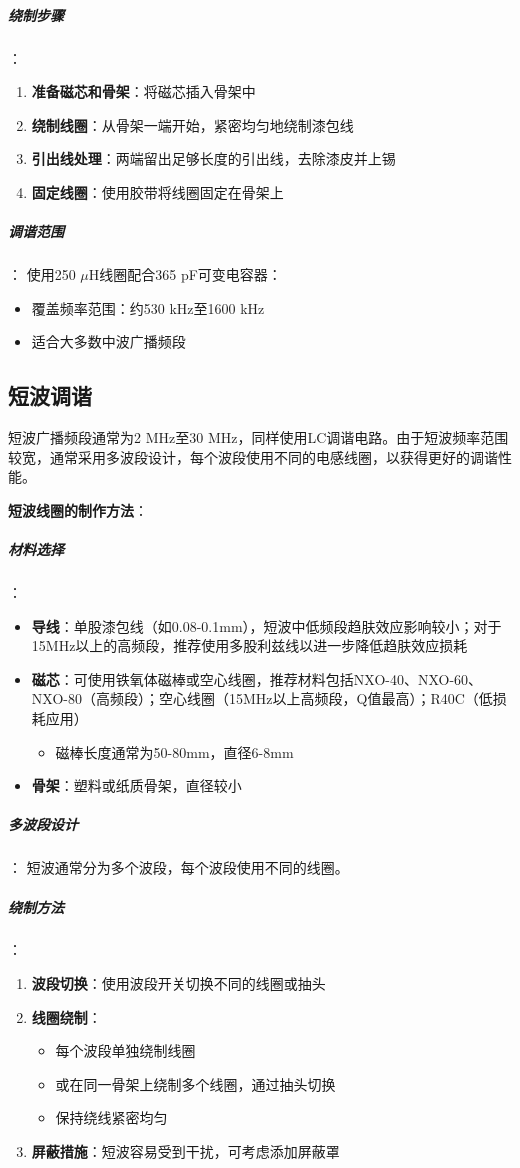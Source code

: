 \subparagraph{绕制步骤}：
\begin{enumerate}
    \item \textbf{准备磁芯和骨架}：将磁芯插入骨架中
    \item \textbf{绕制线圈}：从骨架一端开始，紧密均匀地绕制漆包线
    \item \textbf{引出线处理}：两端留出足够长度的引出线，去除漆皮并上锡
    \item \textbf{固定线圈}：使用胶带将线圈固定在骨架上
\end{enumerate}

\subparagraph{调谐范围}：
使用250 $\mu$H线圈配合365 pF可变电容器：
\begin{itemize}
    \item 覆盖频率范围：约530 kHz至1600 kHz
    \item 适合大多数中波广播频段
\end{itemize}

\subsection{短波调谐}
\label{sec:sw_tuning_application}

短波广播频段通常为2 MHz至30 MHz，同样使用LC调谐电路。由于短波频率范围较宽，通常采用多波段设计，每个波段使用不同的电感线圈，以获得更好的调谐性能。

\textbf{短波线圈的制作方法}：

\subparagraph{材料选择}：
\begin{itemize}
  \item \textbf{导线}：单股漆包线（如0.08-0.1mm），短波中低频段趋肤效应影响较小；对于15MHz以上的高频段，推荐使用多股利兹线以进一步降低趋肤效应损耗
  \item \textbf{磁芯}：可使用铁氧体磁棒或空心线圈，推荐材料包括NXO-40、NXO-60、NXO-80（高频段）；空心线圈（15MHz以上高频段，Q值最高）；R40C（低损耗应用）
    \begin{itemize}
        \item 磁棒长度通常为50-80mm，直径6-8mm
    \end{itemize}
  \item \textbf{骨架}：塑料或纸质骨架，直径较小
\end{itemize}

\subparagraph{多波段设计}：
短波通常分为多个波段，每个波段使用不同的线圈。

\subparagraph{绕制方法}：
\begin{enumerate}
    \item \textbf{波段切换}：使用波段开关切换不同的线圈或抽头
    \item \textbf{线圈绕制}：
    \begin{itemize}
        \item 每个波段单独绕制线圈
        \item 或在同一骨架上绕制多个线圈，通过抽头切换
        \item 保持绕线紧密均匀
    \end{itemize}
    \item \textbf{屏蔽措施}：短波容易受到干扰，可考虑添加屏蔽罩
\end{enumerate}

